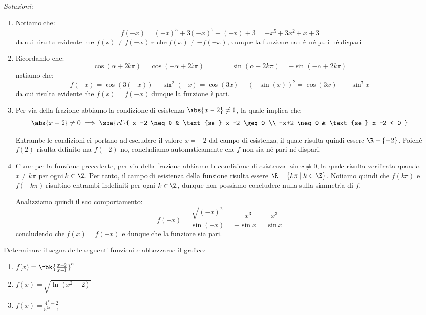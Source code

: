 \documentclass[a4paper, 12pt]{report}
\begin{document}
    \textit{Soluzioni:}
    \begin{enumerate}
        \item Notiamo che:
        \[f(-x) = (-x)^5+3(-x)^2-(-x)+3 = -x^5+3x^2+x+3\]
        da cui risulta evidente che $f(x) \neq f(-x)$ e che $f(x) \neq -f(-x)$, dunque la funzione non è né pari né dispari.

        \item Ricordando che:
        \[\cos(\alpha + 2k\pi) = \cos(-\alpha + 2k\pi) \qquad\qquad \sin(\alpha + 2k\pi) = - \sin(-\alpha + 2k\pi)\]
        notiamo che:
        \[f(-x) =  \cos(3(-x)) - \sin^2 (-x) = \cos(3x) - (-\sin(x))^2 = \cos(3x) - - \sin^2 x\]
        da cui risulta evidente che $f(x) = f(-x)$ dunque la funzione è pari.

        \item Per via della frazione abbiamo la condizione di esistenza $\abs{x-2} \neq 0$, la quale implica che:
        \[\abs{x-2} \neq 0 \implies \soe{rl}{
            x -2 \neq 0 & \text{se } x -2 \geq 0 \\
            -x+2 \neq 0 & \text{se } x -2 < 0
        }\]

        Entrambe le condizioni ci portano ad escludere il valore $x = -2$ dal campo di esistenza, il quale risulta quindi essere $\R-\{-2\}$. Poiché $f(2)$ risulta definito ma $f(-2)$ no, concludiamo automaticamente che $f$ non sia né pari né dispari.

        \item Come per la funzione precedente, per via della frazione abbiamo la condizione di esistenza $\sin x \neq 0$, la quale risulta verificata quando $x \neq k\pi$ per ogni $k \in \Z$. Per tanto, il campo di esistenza della funzione risulta essere $\R - \{k\pi \mid k \in \Z\}$. Notiamo quindi che  $f(k\pi)$ e $f(-k\pi)$ risultino entrambi indefiniti per ogni $k \in \Z$, dunque non possiamo concludere nulla sulla simmetria di $f$.
        
        Analizziamo quindi il suo comportamento:
        \[f(-x) = \frac{\sqrt{(-x)^3}}{\sin(-x)} = \frac{-x^3}{-\sin x} = \frac{x^3}{\sin x}\]
        concludendo che $f(x) = f(-x)$ e dunque che la funzione sia pari.
    \end{enumerate}

    \begin{framedprob}{}
        Determinare il segno delle seguenti funzioni e abbozzarne il grafico:
        \begin{enumerate}
            \item $f(x) = \rbk{\frac{x-2}{x-1}}^e$
            \item $f(x) = \sqrt{\ln(x^2-2)}$
            \item $f(x) = \frac{4^x-2}{5^{2x}-1}$
        \end{enumerate}
    \end{framedprob}
\end{document}
